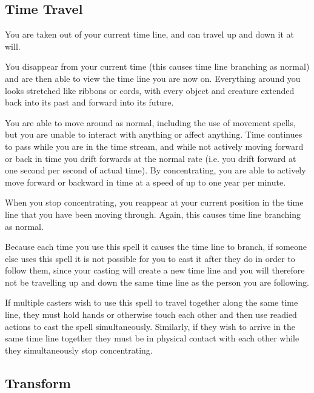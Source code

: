 \begin{multicols*}{2}
\subsection{Time Travel}

You are taken out of your current time line, and can travel up and down it at will.

You disappear from your current time (this causes time line branching as normal) and are then able to view the time line you are now on. Everything around you looks stretched like ribbons or cords, with every object and creature extended back into its past and forward into its future.

You are able to move around as normal, including the use of movement spells, but you are unable to interact with anything or affect anything. Time continues to pass while you are in the time stream, and while not actively moving forward or back in time you drift forwards at the normal rate (i.e. you drift forward at one second per second of actual time). By concentrating, you are able to actively move forward or backward in time at a speed of up to one year per minute.

When you stop concentrating, you reappear at your current position in the time line that you have been moving through. Again, this causes time line branching as normal.

Because each time you use this spell it causes the time line to branch, if someone else uses this spell it is not possible for you to cast it after they do in order to follow them, since your casting will create a new time line and you will therefore not be travelling up and down the same time line as the person you are following.

If multiple casters wish to use this spell to travel together along the same time line, they must hold hands or otherwise touch each other and then use readied actions to cast the spell simultaneously. Similarly, if they wish to arrive in the same time line together they must be in physical contact with each other while they simultaneously stop concentrating.

\subsection{Transform}
\end{multicols*}
